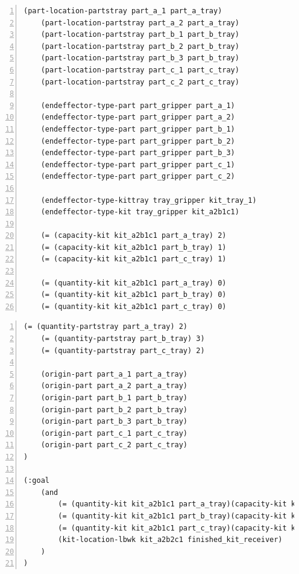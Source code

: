 \begin{center}
\begin{minipage}{.5\paperwidth}
\begin{mylisting}
\begin{Verbatim}[commandchars=\\\{\},fontsize=\scriptsize,  firstnumber=continue, numbers=left, numbersep=2pt]
    (part-location-partstray part_a_1 part_a_tray)
    (part-location-partstray part_a_2 part_a_tray)
    (part-location-partstray part_b_1 part_b_tray)
    (part-location-partstray part_b_2 part_b_tray)
    (part-location-partstray part_b_3 part_b_tray)
    (part-location-partstray part_c_1 part_c_tray)
    (part-location-partstray part_c_2 part_c_tray)
	
    (endeffector-type-part part_gripper part_a_1)
    (endeffector-type-part part_gripper part_a_2)
    (endeffector-type-part part_gripper part_b_1)
    (endeffector-type-part part_gripper part_b_2)
    (endeffector-type-part part_gripper part_b_3)
    (endeffector-type-part part_gripper part_c_1)
    (endeffector-type-part part_gripper part_c_2)

    (endeffector-type-kittray tray_gripper kit_tray_1)
    (endeffector-type-kit tray_gripper kit_a2b1c1)

    (= (capacity-kit kit_a2b1c1 part_a_tray) 2)
    (= (capacity-kit kit_a2b1c1 part_b_tray) 1)
    (= (capacity-kit kit_a2b1c1 part_c_tray) 1)

    (= (quantity-kit kit_a2b1c1 part_a_tray) 0)
    (= (quantity-kit kit_a2b1c1 part_b_tray) 0)
    (= (quantity-kit kit_a2b1c1 part_c_tray) 0)
\end{Verbatim}
\end{mylisting}
\end{minipage}

\begin{minipage}{.5\paperwidth}
\begin{mylisting}
\begin{Verbatim}[commandchars=\\\{\},fontsize=\scriptsize,  firstnumber=continue, numbers=left, numbersep=2pt]	
    (= (quantity-partstray part_a_tray) 2)
    (= (quantity-partstray part_b_tray) 3)
    (= (quantity-partstray part_c_tray) 2)

    (origin-part part_a_1 part_a_tray)
    (origin-part part_a_2 part_a_tray)
    (origin-part part_b_1 part_b_tray)
    (origin-part part_b_2 part_b_tray)
    (origin-part part_b_3 part_b_tray)
    (origin-part part_c_1 part_c_tray)
    (origin-part part_c_2 part_c_tray)
)

(:goal
    (and
        (= (quantity-kit kit_a2b1c1 part_a_tray)(capacity-kit kit_a2b1c1 part_a_tray))
        (= (quantity-kit kit_a2b1c1 part_b_tray)(capacity-kit kit_a2b1c1 part_b_tray))
        (= (quantity-kit kit_a2b1c1 part_c_tray)(capacity-kit kit_a2b1c1 part_c_tray))
        (kit-location-lbwk kit_a2b2c1 finished_kit_receiver)
    )
)
\end{Verbatim}
\end{mylisting}
\end{minipage}
\end{center}

